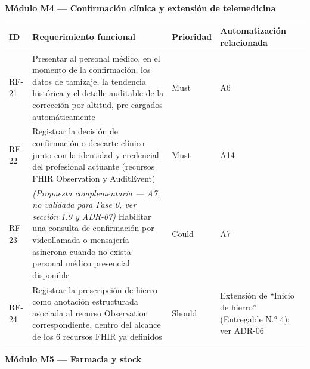 \documentclass[11pt,a4paper]{article}
\begin{document}
\textbf{Módulo M4 --- Confirmación clínica y extensión de telemedicina}

{\small
\begin{longtable}[]{@{}
  >{\raggedright\arraybackslash}p{}
  >{\raggedright\arraybackslash}p{}
  >{\raggedright\arraybackslash}p{}
  >{\raggedright\arraybackslash}p{}@{}}
\toprule\noalign{}
\begin{minipage}[b]{\linewidth}\raggedright
ID
\end{minipage} & \begin{minipage}[b]{\linewidth}\raggedright
Requerimiento funcional
\end{minipage} & \begin{minipage}[b]{\linewidth}\raggedright
Prioridad
\end{minipage} & \begin{minipage}[b]{\linewidth}\raggedright
Automatización relacionada
\end{minipage} \\
\midrule\noalign{}
\endhead
\bottomrule\noalign{}
\endlastfoot
RF-21 & Presentar al personal médico, en el momento de la confirmación, los datos de tamizaje, la tendencia histórica y el detalle auditable de la corrección por altitud, pre-cargados automáticamente & Must & A6 \\
RF-22 & Registrar la decisión de confirmación o descarte clínico junto con la identidad y credencial del profesional actuante (recursos FHIR Observation y AuditEvent) & Must & A14 \\
RF-23 & \emph{(Propuesta complementaria --- A7, no validada para Fase 0, ver sección 1.9 y ADR-07)} Habilitar una consulta de confirmación por videollamada o mensajería asíncrona cuando no exista personal médico presencial disponible & Could & A7 \\
RF-24 & Registrar la prescripción de hierro como anotación estructurada asociada al recurso Observation correspondiente, dentro del alcance de los 6 recursos FHIR ya definidos & Should & Extensión de ``Inicio de hierro'' (Entregable N.° 4); ver ADR-06 \\
\end{longtable}
}

\textbf{Módulo M5 --- Farmacia y stock}
\end{document}

